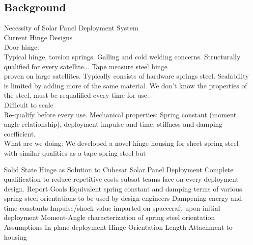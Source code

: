 
\subsection{Background}



Necessity of Solar Panel Deployment System \\
Current Hinge Designs\\
Door hinge: \\
	Typical hinge, torsion springs. Galling and cold welding concerns. Structurally qualified for every satellite... 
Tape measure steel hinge\\
	proven on large satellites. Typically consists of hardware springs steel. Scalability is limited by adding more of the same material. We don’t know the properties of the steel, must be requalified every time for use. \\
	Difficult to scale\\
	Re-qualify before every use. Mechanical properties: Spring constant (moment angle relationship), deployment impulse and time, stiffness and damping coefficient. \\

What are we doing: We developed a novel hinge housing for sheet spring steel with similar qualities as a tape spring steel but 


Solid State Hinge as Solution to Cubesat Solar Panel Deployment
Complete qualification to reduce repetitive costs subsat teams face on every deployment design.
Report Goals
Equivalent spring constant and damping terms of various spring steel orientations to be used by design engineers
Dampening energy and time constants
Impulse/shock value imparted on spacecraft upon initial deployment
Moment-Angle characterization of spring steel orientation
Assumptions
In plane deployment
Hinge Orientation
Length
Attachment to housing
